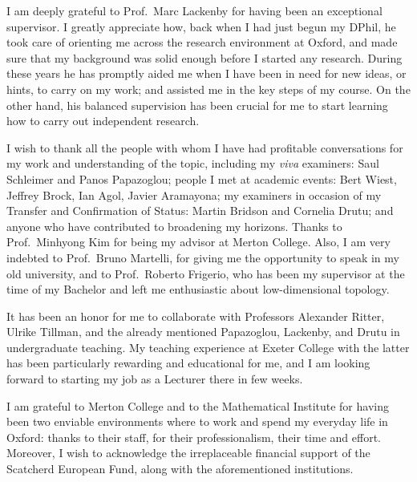 I am deeply grateful to  Prof.\ Marc Lackenby for having been an exceptional supervisor. I greatly appreciate how, back when I had just begun my DPhil, he took care of orienting me across the research environment at Oxford, and made sure that my background was solid enough before I started any research. During these years he has promptly aided me when I have been in need for new ideas, or hints, to carry on my work; and assisted me in the key steps of my course. On the other hand, his balanced supervision has been crucial for me to start learning how to carry out independent research.

I wish to thank all the people with whom I have had profitable conversations for my work and understanding of the topic, including my {\it viva} examiners: Saul Schleimer and Panos Papazoglou; people I met at academic events: Bert Wiest, Jeffrey Brock, Ian Agol, Javier Aramayona; my examiners in occasion of my Transfer and Confirmation of Status: Martin Bridson and Cornelia Drutu; and anyone who have contributed to broadening my horizons. Thanks to Prof.\ Minhyong Kim for being my advisor at Merton College. Also, I am very indebted to Prof.\ Bruno Martelli, for giving me the opportunity to speak in my old university, and to Prof.\ Roberto Frigerio, who has been my supervisor at the time of my Bachelor and left me enthusiastic about low-dimensional topology.

It has been an honor for me to collaborate with Professors Alexander Ritter, Ulrike Tillman, and the already mentioned Papazoglou, Lackenby, and Drutu in undergraduate teaching. My teaching experience at Exeter College with the latter has been particularly rewarding and educational for me, and I am looking forward to starting my job as a Lecturer there in few weeks.

I am grateful to Merton College and to the Mathematical Institute for having been two enviable environments where to work and spend my everyday life in Oxford: thanks to their staff, for their professionalism, their time and effort. Moreover, I wish to acknowledge the irreplaceable financial support of the Scatcherd European Fund, along with the aforementioned institutions.